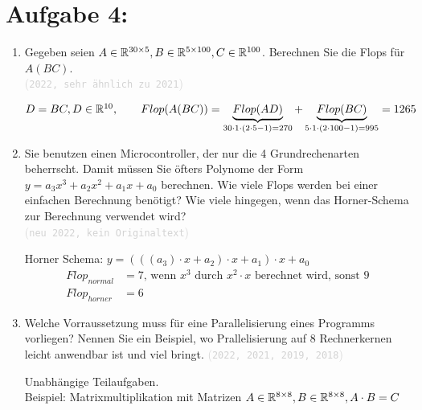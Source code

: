 \documentclass[12pt]{article}
\newcommand{\kommentarMacro}[1]{\textcolor{lightgray}{(\texttt{#1})}}
\begin{document}
\section*{Aufgabe 4:}
\begin{enumerate}
    \item Gegeben seien $A\in \mathbb{R}^{30\times 5}, B\in \mathbb{R}^{5\times 100}, C\in \mathbb{R}^{100}$. Berechnen Sie die Flops für $A(BC)$. \\ \kommentarMacro{2022, sehr ähnlich zu 2021}

          \begin{solution}
              $D = BC, D\in \mathbb{R}^{10},\qquad Flop(A(BC)) = \underbrace{Flop(AD)}_{30\cdot 1\cdot (2\cdot 5 - 1) = 270} + \underbrace{Flop(BC)}_{5\cdot 1\cdot (2\cdot 100 - 1) = 995} = 1265$
          \end{solution}

    \item Sie benutzen einen Microcontroller, der nur die 4 Grundrechenarten beherrscht. Damit müssen Sie öfters Polynome der Form $y=a_3x^3+a_2x^2+a_1x+a_0$ berechnen. Wie viele Flops werden bei einer einfachen Berechnung benötigt? Wie viele hingegen, wenn das Horner-Schema zur Berechnung verwendet wird? \\ \kommentarMacro{neu 2022, kein Originaltext}

          \begin{solution}
              Horner Schema: $y=\left(\left(\left(a_3\right)\cdot x + a_2\right)\cdot x + a_1\right)\cdot x + a_0$ \\
              \begin{align*}
                  Flop_{normal} & = 7\text{, wenn } x^3 \text{ durch } x^2 \cdot x \text{ berechnet wird, sonst } 9 \\
                  Flop_{horner} & = 6
              \end{align*}
          \end{solution}
    \item Welche Vorraussetzung muss für eine Parallelisierung eines Programms vorliegen? Nennen Sie ein Beispiel, wo Prallelisierung auf 8 Rechnerkernen leicht anwendbar ist und viel bringt. \kommentarMacro{2022, 2021, 2019, 2018}

          \begin{solution}
              Unabhängige Teilaufgaben. \\
              Beispiel: Matrixmultiplikation mit Matrizen $A\in \mathbb{R}^{8\times 8}, B\in \mathbb{R}^{8\times 8}, \\ A\cdot B = C$
          \end{solution}


\end{enumerate}
\end{document}
